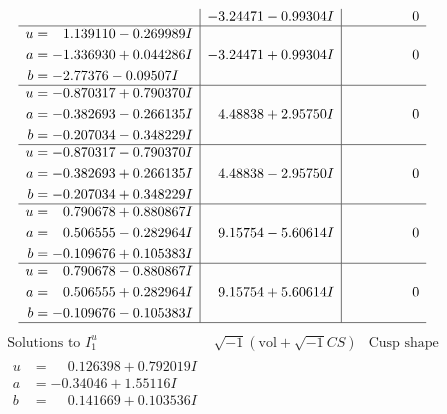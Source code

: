 \documentclass[1p]{elsarticle_modified}
\theoremstyle{definition}
\newcommand{\I}{\sqrt{-1}}
\begin{document}
$$\begin{array}{c|c|c}
 & -3.24471 - 0.99304 I & \phantom{-0.000000 } 0 \\ \hline\begin{aligned}
u &= \phantom{-}1.139110 - 0.269989 I \\
a &= -1.336930 + 0.044286 I \\
b &= -2.77376 - 0.09507 I\end{aligned}
 & -3.24471 + 0.99304 I & \phantom{-0.000000 } 0 \\ \hline\begin{aligned}
u &= -0.870317 + 0.790370 I \\
a &= -0.382693 - 0.266135 I \\
b &= -0.207034 - 0.348229 I\end{aligned}
 & \phantom{-}4.48838 + 2.95750 I & \phantom{-0.000000 } 0 \\ \hline\begin{aligned}
u &= -0.870317 - 0.790370 I \\
a &= -0.382693 + 0.266135 I \\
b &= -0.207034 + 0.348229 I\end{aligned}
 & \phantom{-}4.48838 - 2.95750 I & \phantom{-0.000000 } 0 \\ \hline\begin{aligned}
u &= \phantom{-}0.790678 + 0.880867 I \\
a &= \phantom{-}0.506555 - 0.282964 I \\
b &= -0.109676 + 0.105383 I\end{aligned}
 & \phantom{-}9.15754 - 5.60614 I & \phantom{-0.000000 } 0 \\ \hline\begin{aligned}
u &= \phantom{-}0.790678 - 0.880867 I \\
a &= \phantom{-}0.506555 + 0.282964 I \\
b &= -0.109676 - 0.105383 I\end{aligned}
 & \phantom{-}9.15754 + 5.60614 I & \phantom{-0.000000 } 0\\
 \hline 
 \end{array}$$\newpage$$\begin{array}{c|c|c}  
\text{Solutions to }I^u_{1}& \I (\text{vol} + \sqrt{-1}CS) & \text{Cusp shape}\\
 \hline 
\begin{aligned}
u &= \phantom{-}0.126398 + 0.792019 I \\
a &= -0.34046 + 1.55116 I \\
b &= \phantom{-}0.141669 + 0.103536 I\end{aligned}

\end{array}$$
\end{document}
